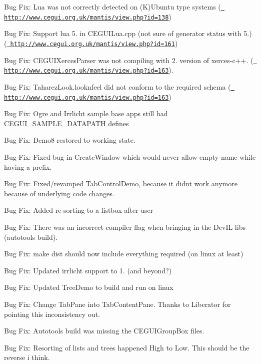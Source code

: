 \begin{DoxyItemize}
\item Bug Fix\+: Lua was not correctly detected on (K)Ubuntu type systems (\href{http://www.cegui.org.uk/mantis/view.php?id=138}{\texttt{ http\+://www.\+cegui.\+org.\+uk/mantis/view.\+php?id=138}})
\item Bug Fix\+: Support lua 5. in C\+E\+G\+U\+I\+Lua.\+cpp (not sure of generator status with 5.) (\href{http://www.cegui.org.uk/mantis/view.php?id=161}{\texttt{ http\+://www.\+cegui.\+org.\+uk/mantis/view.\+php?id=161}})
\item Bug Fix\+: C\+E\+G\+U\+I\+Xerces\+Parser was not compiling with 2. version of xerces-\/c++. (\href{http://www.cegui.org.uk/mantis/view.php?id=163}{\texttt{ http\+://www.\+cegui.\+org.\+uk/mantis/view.\+php?id=163}}).
\item Bug Fix\+: Taharez\+Look.\+looknfeel did not conform to the required schema (\href{http://www.cegui.org.uk/mantis/view.php?id=163}{\texttt{ http\+://www.\+cegui.\+org.\+uk/mantis/view.\+php?id=163}})
\item Bug Fix\+: Ogre and Irrlicht sample base apps still had C\+E\+G\+U\+I\+\_\+\+S\+A\+M\+P\+L\+E\+\_\+\+D\+A\+T\+A\+P\+A\+TH defines
\item Bug Fix\+: Demo8 restored to working state.
\item Bug Fix\+: Fixed bug in Create\+Window which would never allow empty name while having a prefix.
\item Bug Fix\+: Fixed/revamped Tab\+Control\+Demo, because it didn\textquotesingle{}t work anymore because of underlying code changes.
\item Bug Fix\+: Added re-\/sorting to a listbox after user
\item Bug Fix\+: There was an incorrect compiler flag when bringing in the Dev\+IL libs (autotools build).
\item Bug Fix\+: \textquotesingle{}make dist\textquotesingle{} should now include everything required (on linux at least)
\item Bug Fix\+: Updated irrlicht support to 1. (and beyond?)
\item Bug Fix\+: Updated Tree\+Demo to build and run on linux
\item Bug Fix\+: Change Tab\+Pane into Tab\+Content\+Pane. Thanks to Liberator for pointing this inconsistency out.
\item Bug Fix\+: Autotools build was missing the C\+E\+G\+U\+I\+Group\+Box files.
\item Bug Fix\+: Resorting of lists and trees happened High to Low. This should be the reverse i think.

\end{DoxyItemize}
